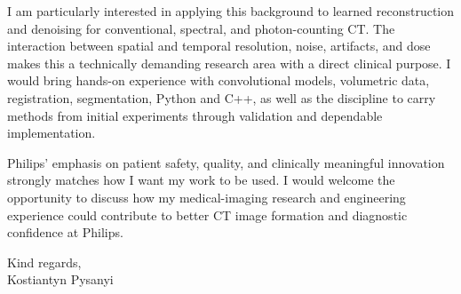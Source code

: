 \documentclass[11pt,a4paper]{article}
\begin{document}
I am particularly interested in applying this background to learned reconstruction and denoising for conventional, spectral, and photon-counting CT. The interaction between spatial and temporal resolution, noise, artifacts, and dose makes this a technically demanding research area with a direct clinical purpose. I would bring hands-on experience with convolutional models, volumetric data, registration, segmentation, Python and C++, as well as the discipline to carry methods from initial experiments through validation and dependable implementation.

Philips' emphasis on patient safety, quality, and clinically meaningful innovation strongly matches how I want my work to be used. I would welcome the opportunity to discuss how my medical-imaging research and engineering experience could contribute to better CT image formation and diagnostic confidence at Philips.

Kind regards,\\
Kostiantyn Pysanyi
\end{document}

